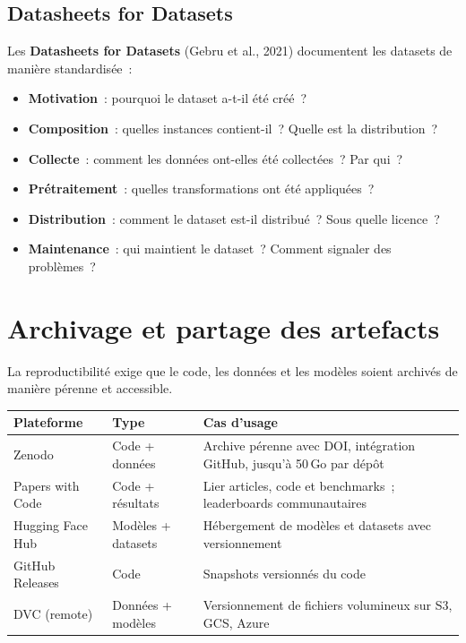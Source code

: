 \subsection{Datasheets for Datasets}

Les \textbf{Datasheets for Datasets} (Gebru et al., 2021) documentent les
datasets de mani\`ere standardis\'ee~:

\begin{itemize}
  \item \textbf{Motivation}~: pourquoi le dataset a-t-il \'et\'e cr\'e\'e~?
  \item \textbf{Composition}~: quelles instances contient-il~? Quelle est
    la distribution~?
  \item \textbf{Collecte}~: comment les donn\'ees ont-elles \'et\'e
    collect\'ees~? Par qui~?
  \item \textbf{Pr\'etraitement}~: quelles transformations ont \'et\'e
    appliqu\'ees~?
  \item \textbf{Distribution}~: comment le dataset est-il distribu\'e~?
    Sous quelle licence~?
  \item \textbf{Maintenance}~: qui maintient le dataset~? Comment signaler
    des probl\`emes~?
\end{itemize}

\section{Archivage et partage des artefacts}
\label{sec:archivage}

La reproductibilit\'e exige que le code, les donn\'ees et les mod\`eles
soient archiv\'es de mani\`ere p\'erenne et accessible.

\begin{formules}[title=\textbf{Plateformes d'archivage}]
\begin{tabular}{@{}llp{6cm}@{}}
\toprule
\textbf{Plateforme} & \textbf{Type} & \textbf{Cas d'usage} \\
\midrule
Zenodo & Code + donn\'ees & Archive p\'erenne avec DOI, int\'egration GitHub,
  jusqu'\`a 50\,Go par d\'ep\^ot \\
Papers with Code & Code + r\'esultats & Lier articles, code et benchmarks~;
  leaderboards communautaires \\
Hugging Face Hub & Mod\`eles + datasets & H\'ebergement de mod\`eles et
  datasets avec versionnement \\
GitHub Releases & Code & Snapshots versionn\'es du code \\
DVC (remote) & Donn\'ees + mod\`eles & Versionnement de fichiers volumineux
  sur S3, GCS, Azure \\
\bottomrule
\end{tabular}
\end{formules}

